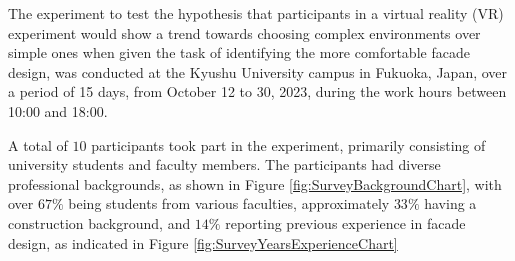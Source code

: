 
The experiment to test the hypothesis that participants in a virtual reality (VR) experiment would show a trend towards choosing complex environments over simple ones when given the task of identifying the more comfortable facade design, was conducted at the Kyushu University campus in Fukuoka, Japan, over a period of 15 days, from October 12 to 30, 2023, during the work hours between 10:00 and 18:00.

A total of \(10\) participants took part in the experiment, primarily consisting of university students and faculty members.
The participants had diverse professional backgrounds, as shown in Figure \ref{fig:SurveyBackgroundChart}, with over \(67\%\) being students from various faculties, approximately \(33\%\) having a construction background, and \(14\%\) reporting previous experience in facade design, as indicated in Figure \ref{fig:SurveyYearsExperienceChart}

